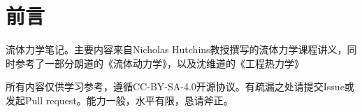 \section*{前言}

流体力学笔记。主要内容来自Nicholas Hutchins教授撰写的流体力学课程讲义，同时参考了一部分朗道的《流体动力学》，以及沈维道的《工程热力学》

所有内容仅供学习参考，遵循CC-BY-SA-4.0开源协议。有疏漏之处请提交Issue或发起Pull request。能力一般，水平有限，恳请斧正。
